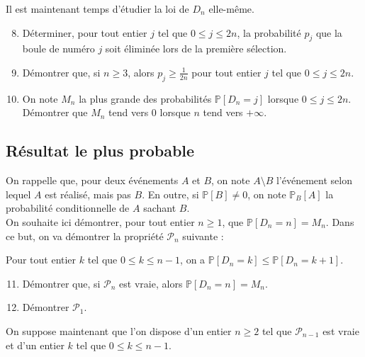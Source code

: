 \documentclass[landscape,twocolumn,leqno,a4paper,10pt]{report} %
\newcommand\n{\noindent}
\renewcommand{\geq}{\geqslant}
\renewcommand{\leq}{\leqslant}
\newcommand{\Prob}{\mathbb{P}}
\begin{document}
\n Il est maintenant temps d'étudier la loi de $D_{n}$ elle-même.

\begin{enumerate}\setcounter{enumi}{7}
  	\item Déterminer, pour tout entier $j$ tel que $0 \leq j \leq 2 n$, la probabilité $p_{j}$ que la boule de numéro $j$ soit éliminée lors de la première sélection.
  	\item Démontrer que, si $n \geq 3$, alors $p_{j} \geq \frac{1}{2 n}$ pour tout entier $j$ tel que $0 \leq j \leq 2 n$.
  	\item On note $M_{n}$ la plus grande des probabilités $\Prob\left[D_{n}=j\right]$ lorsque $0 \leq j \leq 2 n$.\\
  	Démontrer que $M_{n}$ tend vers 0 lorsque $n$ tend vers $+\infty$.
\end{enumerate}

\subsection{Résultat le plus probable}

\n On rappelle que, pour deux événements $A$ et $B$, on note $A \setminus B$ l'événement selon lequel $A$ est réalisé, mais pas $B$. En outre, si $\Prob[B] \neq 0$, on note $\Prob_{B}[A]$ la probabilité conditionnelle de $A$ sachant $B$.\\

\n On souhaite ici démontrer, pour tout entier $n \geq 1$, que $\Prob\left[D_{n}=n\right]=M_{n}$. Dans ce but, on va démontrer la propriété $\mathscr{P}_{n}$ suivante :

\begin{center}
Pour tout entier $k$ tel que $0 \leq k \leq n-1$, on a $\Prob\left[D_{n}=k\right] \leq \Prob\left[D_{n}=k+1\right]$.
\end{center}


\begin{enumerate}\setcounter{enumi}{10}
  	\item Démontrer que, si $\mathscr{P}_{n}$ est vraie, alors $\Prob\left[D_{n}=n\right]=M_{n}$.
  	\item Démontrer $\mathscr{P}_{1}$.
\end{enumerate}

\n On suppose maintenant que l'on dispose d'un entier $n \geq 2$ tel que $\mathscr{P}_{n-1}$ est vraie et d'un entier $k$ tel que $0 \leq k \leq n-1$.
\end{document}
